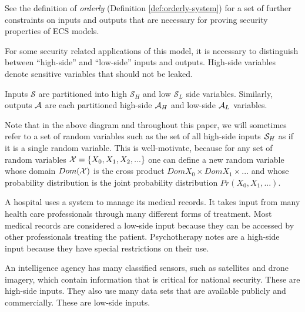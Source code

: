 \documentclass[../thesis.tex]{subfiles}
\begin{document}
See the definition of \emph{orderly} (Definition \ref{def:orderly-system})
for a set of further constraints on inputs and outputs
that are necessary for proving security properties of ECS models.

For some security related applications of this model,
it is necessary to distinguish between ``high-side''
and ``low-side'' inputs and outputs.
High-side variables denote sensitive variables
that should not be leaked.

\begin{dfn}
  Inputs $\mathcal{S}$ are partitioned into high $\mathcal{S}_H$
  and low $\mathcal{S}_L$ side variables.
  Similarly, outputs $\mathcal{A}$ are each partitioned
  high-side $\mathcal{A}_H$ and low-side $\mathcal{A}_L$ variables.
\end{dfn}

\begin{center}
\end{center}

Note that in the above diagram and throughout this paper,
we will sometimes refer to a set of random variables
such as the set of all high-side inputs $\mathcal{S}_H$
as if it is a single random variable.
This is well-motivate, because for any set of random
variables $\mathcal{X} = \{X_0, X_1, X_2, ...\}$
one can define a new random variable
whose domain $Dom(\mathcal{X})$ is the cross product
$Dom{X_0} \times Dom{X_1} \times ...$ and whose
probability distribution is the joint probability
distribution $Pr(X_0, X_1, ...)$.

\begin{exm}
  A hospital uses a system to manage its medical records.
  It takes input from many health care professionals through
  many different forms of treatment.
  Most medical records are considered a low-side input
  because they can be accessed by other professionals
  treating the patient.
  Psychotherapy notes are a high-side input because they
  have special restrictions on their use.
\end{exm}

\begin{exm}
  An intelligence agency has many classified sensors,
  such as satellites and drone imagery, which contain information
  that is critical for national security.
  These are high-side inputs.
  They also use many data sets that are available publicly
  and commercially.
  These are low-side inputs.
\end{exm}
\end{document}
